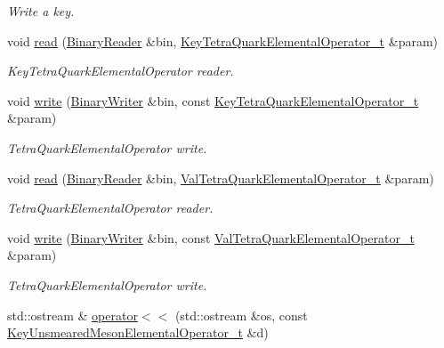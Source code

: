 \begin{DoxyCompactItemize}
\begin{DoxyCompactList}\small\item\em Write a key. \end{DoxyCompactList}\item 
void \mbox{\hyperlink{namespaceHadron_a10d99bb52996f8aec8a87612e98d5684}{read}} (\mbox{\hyperlink{classADATIO_1_1BinaryReader}{Binary\+Reader}} \&bin, \mbox{\hyperlink{structHadron_1_1KeyTetraQuarkElementalOperator__t}{Key\+Tetra\+Quark\+Elemental\+Operator\+\_\+t}} \&param)
\begin{DoxyCompactList}\small\item\em Key\+Tetra\+Quark\+Elemental\+Operator reader. \end{DoxyCompactList}\item 
void \mbox{\hyperlink{namespaceHadron_a4fefcfe0419c7e64ff031011643eb810}{write}} (\mbox{\hyperlink{classADATIO_1_1BinaryWriter}{Binary\+Writer}} \&bin, const \mbox{\hyperlink{structHadron_1_1KeyTetraQuarkElementalOperator__t}{Key\+Tetra\+Quark\+Elemental\+Operator\+\_\+t}} \&param)
\begin{DoxyCompactList}\small\item\em Tetra\+Quark\+Elemental\+Operator write. \end{DoxyCompactList}\item 
void \mbox{\hyperlink{namespaceHadron_a614faa9c1c7ae1880f009d5c9aa672ec}{read}} (\mbox{\hyperlink{classADATIO_1_1BinaryReader}{Binary\+Reader}} \&bin, \mbox{\hyperlink{structHadron_1_1ValTetraQuarkElementalOperator__t}{Val\+Tetra\+Quark\+Elemental\+Operator\+\_\+t}} \&param)
\begin{DoxyCompactList}\small\item\em Tetra\+Quark\+Elemental\+Operator reader. \end{DoxyCompactList}\item 
void \mbox{\hyperlink{namespaceHadron_ac78ff88ef705b3eaa48d7d440fe2a299}{write}} (\mbox{\hyperlink{classADATIO_1_1BinaryWriter}{Binary\+Writer}} \&bin, const \mbox{\hyperlink{structHadron_1_1ValTetraQuarkElementalOperator__t}{Val\+Tetra\+Quark\+Elemental\+Operator\+\_\+t}} \&param)
\begin{DoxyCompactList}\small\item\em Tetra\+Quark\+Elemental\+Operator write. \end{DoxyCompactList}\item 
std\+::ostream \& \mbox{\hyperlink{namespaceHadron_ae69192d40800d30f5ef75a6d3ce3ae6e}{operator$<$$<$}} (std\+::ostream \&os, const \mbox{\hyperlink{structHadron_1_1KeyUnsmearedMesonElementalOperator__t}{Key\+Unsmeared\+Meson\+Elemental\+Operator\+\_\+t}} \&d)

\end{DoxyCompactItemize}
